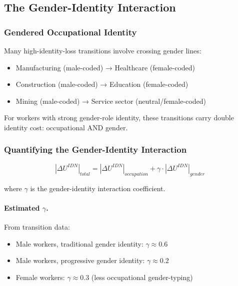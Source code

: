 \subsection{The Gender-Identity Interaction}

\subsubsection{Gendered Occupational Identity}

Many high-identity-loss transitions involve crossing gender lines:

\begin{itemize}
    \item Manufacturing (male-coded) → Healthcare (female-coded)
    \item Construction (male-coded) → Education (female-coded)
    \item Mining (male-coded) → Service sector (neutral/female-coded)
\end{itemize}

For workers with strong gender-role identity, these transitions carry 
double identity cost: occupational AND gender.

\subsubsection{Quantifying the Gender-Identity Interaction}

\begin{equation}
|\Delta U^{IDN}|_{total} = |\Delta U^{IDN}|_{occupation} + \gamma \cdot |\Delta U^{IDN}|_{gender}
\label{eq:gender-identity}
\end{equation}

where $\gamma$ is the gender-identity interaction coefficient.

\paragraph{Estimated $\gamma$.}
From transition data:
\begin{itemize}
    \item Male workers, traditional gender identity: $\gamma \approx 0.6$
    \item Male workers, progressive gender identity: $\gamma \approx 0.2$
    \item Female workers: $\gamma \approx 0.3$ (less occupational gender-typing)
\end{itemize}

